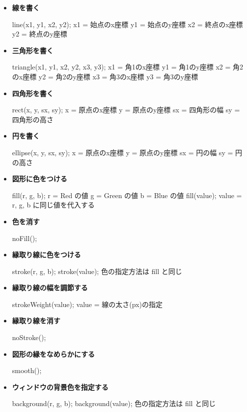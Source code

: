 \documentclass[11pt,a4paper]{jarticle}
\begin{document}
\begin{itemize}
 \item \textbf{線を書く}

       line(x1, y1, x2, y2);
       x1 = 始点のx座標 y1 = 始点のy座標
       x2 = 終点のx座標 y2 = 終点のy座標

 \item \textbf{三角形を書く}

       triangle(x1, y1, x2, y2, x3, y3);
       x1 = 角1のx座標 y1 = 角1のy座標
       x2 = 角2のx座標 y2 = 角2のy座標
       x3 = 角3のx座標 y3 = 角3のy座標

 \item \textbf{四角形を書く}

       rect(x, y, sx, sy);
       x = 原点のx座標 y = 原点のy座標
       sx = 四角形の幅 sy = 四角形の高さ

 \item \textbf{円を書く}

       ellipse(x, y, sx, sy);
       x = 原点のx座標 y = 原点のy座標
       sx = 円の幅 sy = 円の高さ

 \item \textbf{図形に色をつける}

       fill(r, g, b);
       r = Red の値  g = Green の値  b = Blue の値
       fill(value);
       value = r, g, b に同じ値を代入する

 \item \textbf{色を消す}

       noFill();
       
 \item \textbf{縁取り線に色をつける}

       stroke(r, g, b);
       stroke(value);
       色の指定方法は fill と同じ

 \item \textbf{縁取り線の幅を調節する}
       
       strokeWeight(value);
       value = 線の太さ(px)の指定

 \item \textbf{縁取り線を消す}

       noStroke();

 \item \textbf{図形の縁をなめらかにする}

       smooth();

 \item \textbf{ウィンドウの背景色を指定する}

       background(r, g, b);
       background(value);
       色の指定方法は fill と同じ
\end{itemize}
\end{document}
